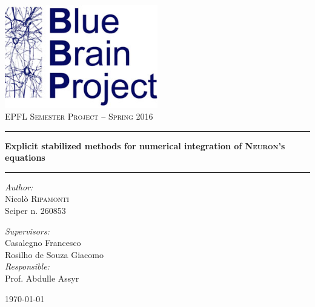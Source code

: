 \documentclass[a4paper,11pt ]{report}
\theoremstyle{definition}
\begin{document}
\begin{titlepage}
    \begin{center}
        \includegraphics[width=0.5\textwidth]{img/logo}~\\[0.3cm]
        \textsc{\Large EPFL Semester Project -- Spring 2016}\\[0.5cm]
        \hrule
        \hspace{0.8cm}
        { \huge{ \bfseries Explicit stabilized methods for numerical integration of \textsc{Neuron}'s equations}}
        \hrule 
        \begin{minipage}{0.4\textwidth}
            \begin{flushleft} \large
                \emph{Author:}\\
                Nicol\`o \textsc{Ripamonti}\\
                Sciper n. 260853
            \end{flushleft}
        \end{minipage}
        \begin{minipage}{0.4\textwidth}
            \begin{flushright} \large
                \emph{Supervisors:} \\
                Casalegno Francesco\\
                Rosilho de Souza Giacomo\\
                \bigskip
                \emph{Responsible:} \\
                Prof. Abdulle Assyr
            \end{flushright}
        \end{minipage}
        \vfill
        {\large \today}
    \end{center}
\end{titlepage}


\tableofcontents
\end{document}
